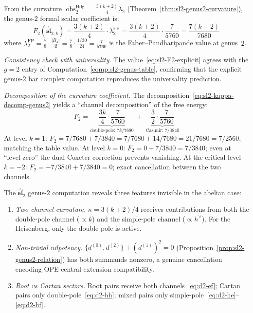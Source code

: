 \begin{computation}
\label{comp:sl2-genus2-F2}
From the curvature
$\operatorname{obs}^{\mathrm{Hdg}}_2
= \frac{3(k+2)}{4} \lambda_2$
(Theorem~\ref{thm:sl2-genus2-curvature}), the genus-$2$ formal scalar coefficient is:
\begin{equation}\label{eq:sl2-F2-explicit}
F_2(\widehat{\mathfrak{sl}}_{2,k})
= \frac{3(k+2)}{4} \cdot \lambda_2^{\mathrm{FP}}
= \frac{3(k+2)}{4} \cdot \frac{7}{5760}
= \frac{7(k+2)}{7680}
\end{equation}
where $\lambda_2^{\mathrm{FP}} = \frac{7}{8} \cdot \frac{|B_4|}{4!}
= \frac{7}{8} \cdot \frac{1/30}{24} = \frac{7}{5760}$
is the Faber--Pandharipande value at genus~$2$.

\emph{Consistency check with universality.}
The value~\eqref{eq:sl2-F2-explicit} agrees with the $g = 2$ entry
of Computation~\ref{comp:sl2-genus-table}, confirming that the
explicit genus-$2$ bar complex computation reproduces the
universality prediction.

\emph{Decomposition of the curvature coefficient.}
The decomposition~\eqref{eq:sl2-kappa-decomp-genus2} yields a
``channel decomposition'' of the free energy:
\[
F_2 = \underbrace{\frac{3k}{4} \cdot \frac{7}{5760}}_{\text{double-pole: } 7k/7680}
\;+\; \underbrace{\frac{3}{2} \cdot \frac{7}{5760}}_{\text{Casimir: } 7/3840}
\]
At level $k = 1$: $F_2 = 7/7680 + 7/3840 = 7/7680 + 14/7680 = 21/7680 = 7/2560$,
matching the table value.
At level $k = 0$: $F_2 = 0 + 7/3840 = 7/3840$; even at ``level zero'' the
dual Coxeter correction prevents vanishing.
At the critical level $k = -2$: $F_2 = -7/3840 + 7/3840 = 0$; exact
cancellation between the two channels.
\end{computation}

\begin{remark}\label{rem:sl2-genus2-nonabelian}
The $\widehat{\mathfrak{sl}}_2$ genus-$2$ computation reveals three features invisible in the abelian case:
\begin{enumerate}
\item \emph{Two-channel curvature.} $\kappa = 3(k+2)/4$ receives contributions from both the double-pole channel ($\propto k$) and the simple-pole channel ($\propto h^\vee$). For the Heisenberg, only the double-pole is active.
\item \emph{Non-trivial nilpotency.} $\{d^{(0)}, d^{(2)}\} + (d^{(1)})^2 = 0$ (Proposition~\ref{prop:sl2-genus2-relation}) has both summands nonzero, a genuine cancellation encoding OPE-central extension compatibility.
\item \emph{Root vs Cartan sectors.} Root pairs receive both channels~\eqref{eq:d2-ef}; Cartan pairs only double-pole~\eqref{eq:d2-hh}; mixed pairs only simple-pole~\eqref{eq:d2-he}--\eqref{eq:d2-hf}.
\end{enumerate}
\end{remark}

